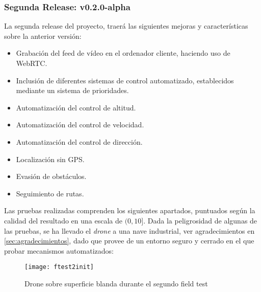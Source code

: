 \subsubsection{Segunda Release: v0.2.0-alpha}
\label{subsec:fieldTestingv2}

La segunda release del proyecto, traerá las siguientes mejoras y características sobre la anterior versión:
\begin{itemize}
\item Grabación del feed de vídeo en el ordenador cliente, haciendo uso de WebRTC.
\item Inclusión de diferentes sistemas de control automatizado, establecidos mediante un sistema de prioridades.
\item Automatización del control de altitud.
\item Automatización del control de velocidad.
\item Automatización del control de dirección.
\item Localización sin GPS.
\item Evasión de obstáculos.
\item Seguimiento de rutas.
\end{itemize}

Las pruebas realizadas comprenden los siguientes apartados, puntuados según la calidad del resultado en una escala de $(0, 10]$. Dada la peligrosidad de algunas de las pruebas, se ha llevado el \emph{drone} a una nave industrial, ver agradecimientos en \ref{sec:agradecimientos}, dado que provee de un entorno seguro y cerrado en el que probar mecanismos automatizados:
\begin{figure}
	\centering
	\texttt{[image: ftest2init]}
	\caption[Field Test 2. Nave industrial]{Drone sobre superficie blanda durante el segundo field test}\label{fig:ftest2init}
\end{figure}

